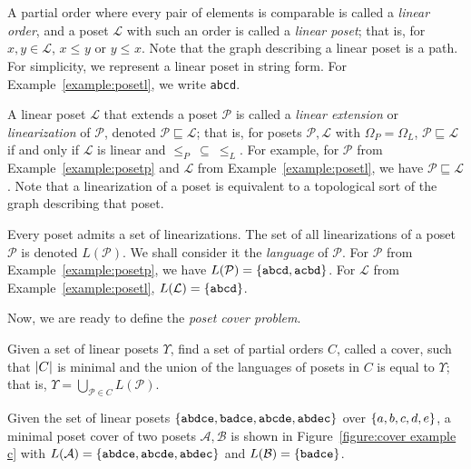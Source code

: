 \documentclass[12pt]{llncs}
\DeclarePairedDelimiter{\set}{\{}{\}}
\DeclarePairedDelimiter{\abs}{\lvert}{\rvert}
\let\oldleq\leq
\renewcommand{\leq}[1][]{\oldleq_{#1}}
\newcommand{\poset}[1]{\mathcal{#1}}
\newcommand{\uni}[1][]{\Omega_{#1}}
\newcommand{\lang}[1]{L(#1)}
\newcommand{\lin}[1]{\texttt{#1}}
\newcommand{\lext}{\sqsubseteq}
\begin{document}
A partial order where every pair of elements is comparable is called a \emph{linear order}, and a poset $\poset{L}$ with such an order is called a \emph{linear poset}; that is, for $x, y \!\in\! \poset{L}$, $x \leq y$ or $y \leq x$. Note that the graph describing a linear poset is a path. For simplicity, we represent a linear poset in string form. For Example~\ref{example:posetl}, we write \lin{abcd}.

A linear poset $\poset{L}$ that extends a poset $\poset{P}$ is called a \emph{linear extension} or \emph{linearization} of $\poset{P}$, denoted $\poset{P} \lext \poset{L}$; that is, for posets $\poset{P},\poset{L}$ with $\uni[P] \!=\! \uni[L]$, $\poset{P} \lext \poset{L}$ if and only if $\poset{L}$ is linear and $\leq[P] \>\subseteq\> \leq[L]$. For example, for $\poset{P}$ from Example~\ref{example:posetp} and $\poset{L}$ from Example~\ref{example:posetl}, we have $\poset{P} \lext \poset{L}$. Note that a linearization of a poset is equivalent to a topological sort of the graph describing that poset.

Every poset admits a set of linearizations. The set of all linearizations of a poset $\poset{P}$ is denoted $\lang{\poset{P}}$. We shall consider it the \emph{language} of $\poset{P}$. For $\poset{P}$ from Example~\ref{example:posetp}, we have $\lang{\poset{P}} = \set{\lin{abcd},\lin{acbd}}$. For $\poset{L}$ from Example~\ref{example:posetl}, $\lang{\poset{L}} = \set{\lin{abcd}}$.

Now, we are ready to define the \emph{poset cover problem}.

\begin{definition}
    Given a set of linear posets $\Upsilon$, find a set of partial orders $C$, called a cover, such that $\abs{C}$ is minimal and the union of the languages of posets in $C$ is equal to $\Upsilon$; that is, $\Upsilon = \bigcup_{\poset{P} \in C} \lang{\poset{P}}$.
    \label{definition:pcp}
\end{definition}

\begin{example}
    Given the set of linear posets $\set{\lin{abdce},\lin{badce},\lin{abcde},\lin{abdec}}$ over $\set{a,b,c,d,e}$, a minimal poset cover of two posets $\poset{A},\poset{B}$ is shown in Figure~\ref{figure:cover example c} with ${\lang{\poset{A}} = \set{\lin{abdce},\lin{abcde},\lin{abdec}}}$ and ${\lang{\poset{B}} = \set{\lin{badce}}}$.
    \label{example:cover example}
\end{example}
\end{document}
